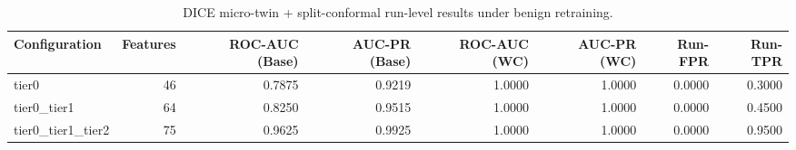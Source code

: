 \begin{table}[t]
\centering
\caption{DICE micro-twin + split-conformal run-level results under benign retraining.}
\label{tab:dice_full_overall}
\footnotesize
\begin{tabular}{lrrrrrrr}
\toprule
Configuration & Features & ROC-AUC (Base) & AUC-PR (Base) & ROC-AUC (WC) & AUC-PR (WC) & Run-FPR & Run-TPR \\
\midrule
tier0 & 46 & 0.7875 & 0.9219 & 1.0000 & 1.0000 & 0.0000 & 0.3000 \\
tier0_tier1 & 64 & 0.8250 & 0.9515 & 1.0000 & 1.0000 & 0.0000 & 0.4500 \\
tier0_tier1_tier2 & 75 & 0.9625 & 0.9925 & 1.0000 & 1.0000 & 0.0000 & 0.9500 \\
\bottomrule
\end{tabular}

\end{table}

